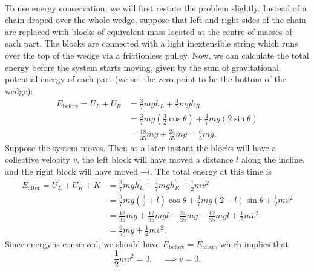 \documentclass[../classical_mechanics.tex]{subfiles}
\begin{document}
\begin{example}
            \paragraph{}
            To use energy conservation, we will first restate the problem slightly.
            Instead of a chain draped over the whole wedge, suppose that left and right sides of the chain are replaced with blocks of equivalent mass located at the centre of masses of each part.
            The blocks are connected with a light inextensible string which runs over the top of the wedge via a frictionless pulley.
            Now, we can calculate the total energy before the system starts moving, given by the sum of gravitational potential energy of each part (we set the zero point to be the bottom of the wedge):
            \begin{align}
                E_\text{before}=U_L+U_R&=\frac{3}{7}mgh_L+\frac{4}{7}mgh_R\\
                &=\frac{3}{7}mg(\frac{3}{2}\cos\theta)+\frac{4}{7}mg(2\sin\theta)\\
                &=\frac{18}{35}mg+\frac{24}{35}mg=\frac{6}{5}mg.
            \end{align}
            Suppose the system moves.
            Then at a later instant the blocks will have a collective velocity $v$, the left block will have moved a distance $l$ along the incline, and the right block will have moved $-l$.
            The total energy at this time is
            \begin{align}
                E_\text{after}=U_L^\prime+U_R^\prime+K&=\frac{3}{7}mgh_L^\prime+\frac{4}{7}mgh_R^\prime+\frac{1}{2}mv^2\\
                &=\frac{3}{7}mg\left(\frac{3}{2}+l\right)\cos\theta+\frac{4}{7}mg(2-l)\sin\theta+\frac{1}{2}mv^2\\
                &=\frac{18}{35}mg+\frac{12}{35}mgl+\frac{24}{35}mg-\frac{12}{35}mgl+\frac{1}{2}mv^2\\
                &=\frac{6}{5}mg+\frac{1}{2}mv^2.
            \end{align}
            Since energy is conserved, we should have $E_\text{before}=E_\text{after}$, which implies that
            \begin{equation}
                \frac{1}{2}mv^2=0,\quad\implies v=0.
            \end{equation}


\end{example}
\end{document}
